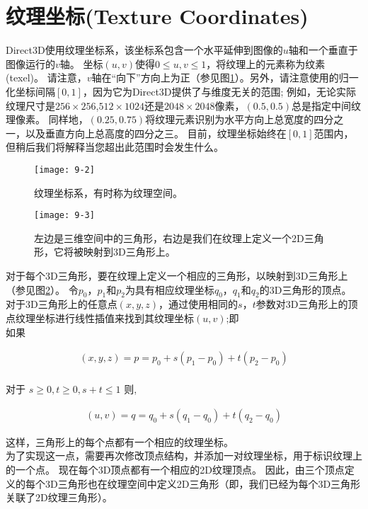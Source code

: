 \section{纹理坐标(Texture Coordinates)}
\begin{flushleft}
Direct3D使用纹理坐标系，该坐标系包含一个水平延伸到图像的$u$轴和一个垂直于图像运行的$v$轴。 坐标$(u,v)$使得$0\leq u,v\leq 1$，将纹理上的元素称为纹素(texel)。 请注意，$v$轴在“向下”方向上为正（参见图\ref{fig:9-2}）。另外，请注意使用的归一化坐标间隔$[0,1]$，因为它为Direct3D提供了与维度无关的范围; 例如，无论实际纹理尺寸是$256\times 256$,$512\times 1024$还是$2048\times 2048$像素，$(0.5,0.5)$总是指定中间纹理像素。 同样地，$(0.25,0.75)$将纹理元素识别为水平方向上总宽度的四分之一，以及垂直方向上总高度的四分之三。 目前，纹理坐标始终在$[0,1]$范围内，但稍后我们将解释当您超出此范围时会发生什么。
\end{flushleft}

\begin{figure}[h]
    \texttt{[image: 9-2]}
    \centering
    \caption{纹理坐标系，有时称为纹理空间。}
    \label{fig:9-2}
\end{figure}

\begin{figure}[h]
    \texttt{[image: 9-3]}
    \centering
    \caption{左边是三维空间中的三角形，右边是我们在纹理上定义一个2D三角形，它将被映射到3D三角形上。}
    \label{fig:9-3}
\end{figure}

\begin{flushleft}
对于每个3D三角形，要在纹理上定义一个相应的三角形，以映射到3D三角形上（参见图\ref{fig:9-3}）。 令$p_{0}$，$p_{1}$和$p_{2}$为具有相应纹理坐标$q_{0}$，$q_{1}$和$q_{2}$的3D三角形的顶点。 对于3D三角形上的任意点$(x,y,z)$，通过使用相同的$s$，$t$参数对3D三角形上的顶点纹理坐标进行线性插值来找到其纹理坐标$(u,v)$;即\\
如果 \\
\end{flushleft}
\begin{align*}
(x,y,z)=p=p_{0}+s(p_{1}-p_{0})+t(p_{2}-p_{0})\\
\end{align*}
\begin{flushleft}
对于 $s\geq 0,t\geq 0,s+t\leq 1$ 则,\\
\end{flushleft}
\begin{align*}
(u,v)=q=q_{0}+s(q_{1}-q_{0})+t(q_{2}-q_{0})
\end{align*}
\begin{flushleft}
这样，三角形上的每个点都有一个相应的纹理坐标。\\
为了实现这一点，需要再次修改顶点结构，并添加一对纹理坐标，用于标识纹理上的一个点。 现在每个3D顶点都有一个相应的2D纹理顶点。 因此，由三个顶点定义的每个3D三角形也在纹理空间中定义2D三角形（即，我们已经为每个3D三角形关联了2D纹理三角形）。\\
\end{flushleft}

